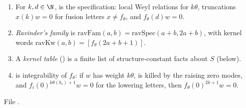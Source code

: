 \begin{definition}\label{l26:def:ravfam}
\leavevmode
\begin{enumerate}
\item[(a)] For $k,d\in\N$,  is the specification: local Weyl relations for $k\theta$, truncations
$x(k)w=0$ for fusion letters $x\neq f_\theta$, and $f_\theta(d)w=0$.
\item[(b)] \emph{Ravinder's family} is $\mathrm{ravFam}(a,b)=\mathrm{ravSpec}(a+b,2a+b)$, with kernel words
$\mathrm{ravKw}(a,b)=[f_\theta(2a+b+1)]$.
\item[(c)] A \emph{kernel table} () is a finite list of structure-constant facts about $S$ (below).
\item[(d)] \textbf{} is integrability of $f_\theta$: if $w$ has weight $k\theta$, is killed by the raising
zero modes, and $f_i(0)^{k\theta(h_i)+1}w=0$ for the lowering letters, then $f_\theta(0)^{2k+1}w=0$.
\end{enumerate}
\end{definition}
\noindent File .
